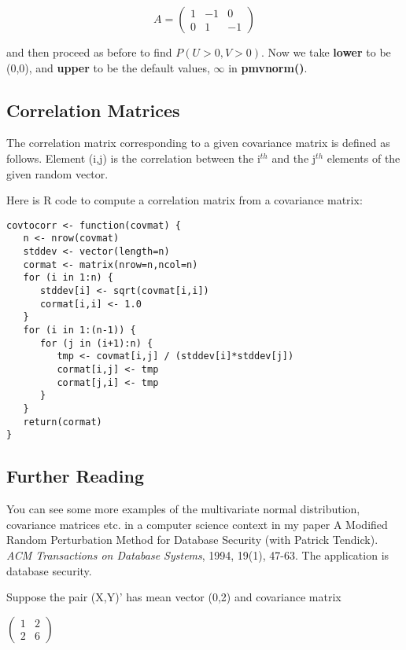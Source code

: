 \begin{equation}
   A = 
      \left (
      \begin{array}{rrr}
      1 & -1 & 0\\
      0 & 1 & -1   
      \end{array}
      \right )     
\end{equation}

and then proceed as before to find $P(U > 0, V > 0)$.  Now we take
{\bf lower} to be (0,0), and {\bf upper} to be the default values,
$\infty$ in {\bf pmvnorm()}.

\subsection{Correlation Matrices}

The correlation matrix corresponding to a given covariance matrix is
defined as follows.  Element (i,j) is the correlation between the
i$^{th}$ and the j$^{th}$ elements of the given random vector.

Here is R code to compute a correlation matrix from a covariance matrix:

\begin{lstlisting}
covtocorr <- function(covmat) {
   n <- nrow(covmat)
   stddev <- vector(length=n)
   cormat <- matrix(nrow=n,ncol=n)
   for (i in 1:n) {
      stddev[i] <- sqrt(covmat[i,i])
      cormat[i,i] <- 1.0
   }
   for (i in 1:(n-1)) {
      for (j in (i+1):n) {
         tmp <- covmat[i,j] / (stddev[i]*stddev[j])
         cormat[i,j] <- tmp
         cormat[j,i] <- tmp
      }
   }
   return(cormat)
}
\end{lstlisting}

\subsection{Further Reading}

You can see some more examples of the multivariate normal distribution,
covariance matrices etc. in a computer science context in my paper 
A Modified Random Perturbation Method for Database Security (with
Patrick Tendick). {\it ACM Transactions on Database Systems}, 1994, 19(1),
47-63.  The application is database security.

\startproblemset

\oneproblem
Suppose the pair (X,Y)' has mean vector (0,2) and covariance matrix

$
\left (
   \begin{array}{cc}
   1 & 2 \\
   2 & 6   
   \end{array}
\right )     
$

